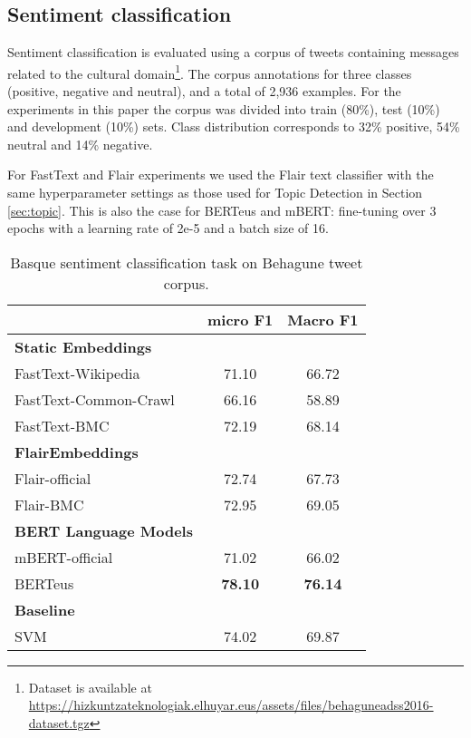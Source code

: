 \documentclass[10pt, a4paper]{article}
\begin{document}
\subsection{Sentiment classification}\label{sec:polarity}

Sentiment classification is evaluated using a corpus of tweets containing messages related to the cultural domain\footnote{Dataset is available at \scriptsize{\url{https://hizkuntzateknologiak.elhuyar.eus/assets/files/behaguneadss2016-dataset.tgz}}}. The corpus annotations for three classes (positive, negative and neutral), and a total of 2,936 examples. For the experiments in this paper the corpus was divided into train (80\%), test (10\%) and development (10\%) sets. Class distribution corresponds to 32\% positive, 54\% neutral and 14\% negative.

For FastText and Flair experiments we used the Flair text classifier with the same hyperparameter settings as those used for Topic Detection in Section \ref{sec:topic}. This is also the case for BERTeus and mBERT: fine-tuning over 3 epochs with a learning rate of 2e-5 and a batch size of 16.

\begin{table}[!ht]\small
\centering
\begin{tabular}{@{\hspace{0.3cm}}lcc} \hline
 {\textbf{}} & {\textbf{micro F1}} &  {\textbf{Macro F1}} \\ \hline
\textbf{Static Embeddings} & & \\
FastText-Wikipedia & 71.10 &	66.72 \\
FastText-Common-Crawl & 66.16 & 58.89  \\
FastText-BMC  & 72.19 &	68.14 \\
\hline%
\textbf{FlairEmbeddings}\\
Flair-official & 72.74 & 67.73 \\
Flair-BMC  & 72.95	& 69.05 \\ \hline
\textbf{BERT Language Models}\\
mBERT-official  & 71.02 & 66.02 \\
BERTeus  & \textbf{78.10}	& \textbf{76.14} \\
\hline
\textbf{Baseline} \\
SVM \cite{san2019multilingual} & 74.02 & 69.87\\ \hline
\end{tabular}
\caption{Basque sentiment classification task on Behagune tweet corpus.}\label{tab:sentiment}
\end{table}
\end{document}
